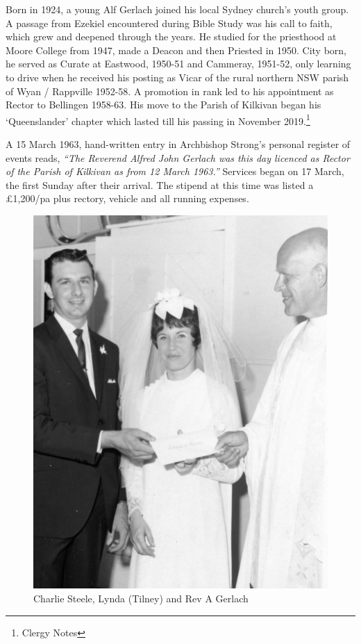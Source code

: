 Born in 1924, a young Alf Gerlach joined his local Sydney church's youth group. A passage from Ezekiel encountered during Bible Study was his call to faith, which grew and deepened through the years. He studied for the priesthood at Moore College from 1947, made a Deacon and then Priested in 1950. City born, he served as Curate at Eastwood, 1950-51 and Cammeray, 1951-52, only learning to drive when he received his posting as Vicar of the rural northern NSW parish of Wyan / Rappville 1952-58. A promotion in rank led to his appointment as Rector to Bellingen 1958-63. His move to the Parish of Kilkivan began his `Queenslander' chapter which lasted till his passing in November 2019.\footnote{Clergy Notes}


A 15 March 1963, hand-written entry in Archbishop Strong's personal register of events reads, \emph{``The Reverend Alfred John Gerlach was this day licenced as Rector of the Parish of Kilkivan as from 12 March 1963.''} Services began on 17 March, the first Sunday after their arrival. The stipend at this time was listed a \pounds1,200/pa plus rectory, vehicle and all running expenses.









\begin{figure}
\begin{center}
\includegraphics[width=1.\linewidth,center]{../images/lyndaTilneyVestry.jpg}
\caption{Charlie Steele, Lynda (Tilney) and Rev A Gerlach}
\end{center}
\end{figure}




